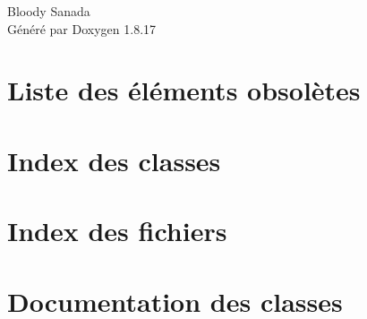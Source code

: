 \let\mypdfximage\pdfximage\def\pdfximage{\immediate\mypdfximage}\documentclass[twoside]{book}
\newcommand{\+}{\discretionary{\mbox{\scriptsize$\hookleftarrow$}}{}{}}
\newcommand{\clearemptydoublepage}{%
  \newpage{\pagestyle{empty}\cleardoublepage}%
}
\begin{document}
\hypersetup{pageanchor=false,
             bookmarksnumbered=true,
             pdfencoding=unicode
            }
\begin{titlepage}
\vspace*{7cm}
\begin{center}%
{\Large Bloody Sanada }\\
\vspace*{1cm}
{\large Généré par Doxygen 1.8.17}\\
\end{center}
\end{titlepage}
\clearemptydoublepage
{}
\tableofcontents
\clearemptydoublepage
{}
\hypersetup{pageanchor=true}

\chapter{Liste des éléments obsolètes}
\label{deprecated}

\chapter{Index des classes}

\chapter{Index des fichiers}

\chapter{Documentation des classes}























\end{document}
